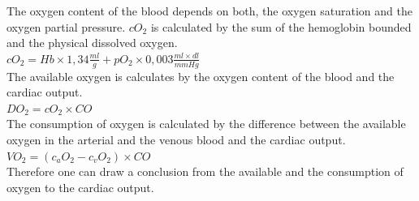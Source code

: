 The oxygen content of the blood depends on both, the oxygen saturation and the oxygen partial pressure. $ cO_{2} $ is calculated by the sum of the hemoglobin bounded and the physical dissolved oxygen.\\

$ cO_{2}=Hb\times 1,34\frac{ml}{g} + pO_{2}\times 0,003\frac{ml\times dl}{mmHg} $\\

The available oxygen is calculates by the oxygen content of the blood and the cardiac output.\\

$ DO_{2}=cO_{2}\times CO $\\

The consumption of oxygen is calculated by the difference between the available oxygen in the arterial and the venous blood and the cardiac output.\\

$ VO_{2}=(c_{a}O_{2}-c_{v}O_{2})\times CO $\\

Therefore one can draw a conclusion from the available and the consumption of oxygen to the cardiac output.